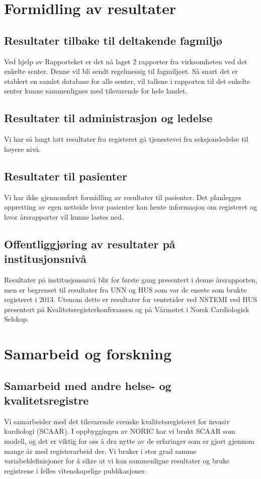 \documentclass[norsk, a4paper]{report}
\begin{document}
\chapter{Formidling av resultater}\label{cha:dat}


\section{Resultater tilbake til deltakende fagmiljø}\label{sec:resfag}
Ved hjelp av Rapporteket er det nå laget 2 rapporter fra virksomheten ved det enkelte senter. Denne vil bli sendt regelmessig til fagmiljøet. Så snart det er etablert en samlet database for alle senter, vil tallene i rapporten til det enkelte senter kunne sammenlignes med tilsvarende for hele landet.

\section{Resultater til administrasjon og ledelse}\label{sec:resled}
Vi har så langt latt resultater fra registeret gå tjenestevei fra seksjonsledelse til høyere nivå.

\section{Resultater til pasienter}\label{sec:respas}
Vi har ikke gjennomført formidling av resultater til pasienter. Det planlegges oppretting av egen nettside hvor pasienter kan hente informasjon om registeret og hvor årsrapporter vil kunne lastes ned.

\section{Offentliggjøring av resultater på institusjonsnivå}\label{sec:off}
Resultater på institusjonsnivå blir for første gang presentert i denne årsrapporten, men er begrenset til resultater fra UNN og HUS som var de eneste som brukte registeret i 2013. Utenom dette er resultater for ventetider ved NSTEMI ved HUS presentert på Kvalitetsregisterkonferansen og på Vårmøtet i Norsk Cardiologisk Selskap.



\chapter{Samarbeid og forskning}\label{cha:for}


\section{Samarbeid med andre helse- og kvalitetsregistre}\label{sec:samfag}
Vi samarbeider med det tilsvarende svenske kvalitetsregisteret for invasiv kardiologi (SCAAR). I oppbyggingen av NORIC har vi brukt SCAAR som modell, og det er viktig for oss å dra nytte av de erfaringer som er gjort gjennom mange år med registerarbeid der. Vi bruker i stor grad samme variabeldefinisjoner for å sikre at vi kan sammenligne resultater og bruke registrene i felles vitenskapelige publikasjoner.
\end{document}
